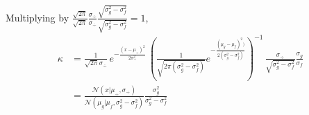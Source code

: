 \documentclass[article]{jss}
\newcommand{\N}{\mathcal{N}}
\begin{document}
Multiplying by $\frac{\sqrt{2\pi}}{\sqrt{2\pi}}\frac{\sigma_{\div}}{\sigma_{\div}}\frac{\sqrt{\sigma_g^2 - \sigma_f^2}}{\sqrt{\sigma_g^2 - \sigma_f^2}}=1$,
\begin{equation}
\begin{split}
 \kappa & =  \frac{1}{\sqrt{2\pi}\sigma_{\div}} \, e^{-\frac{(x - \mu_{\div})^2}{2\sigma_{\div}^2}} \, \left( \frac
 {1}{\sqrt{2\pi(\sigma_g^2 - \sigma_f^2)} } e^{-\frac{(\mu_g - \mu_f)^2)}{2(\sigma_g^2 - \sigma_f^2)}} \right)^{-1} \, \frac{\sigma_{\div}}{\sqrt{\sigma_g^2 - \sigma_f^2}}\frac{\sigma_g}{\sigma_f}\\[0.3cm]
 & = \frac{\N\left(x| \mu_{\div},\sigma_{\div}\right)}{\N\left(\mu_g|\mu_f,\sigma_g^2-\sigma_f^2\right)} \frac{\sigma_g^2}{\sigma_g^2 - \sigma_f^2}
\end{split}
\end{equation}




\end{document}
